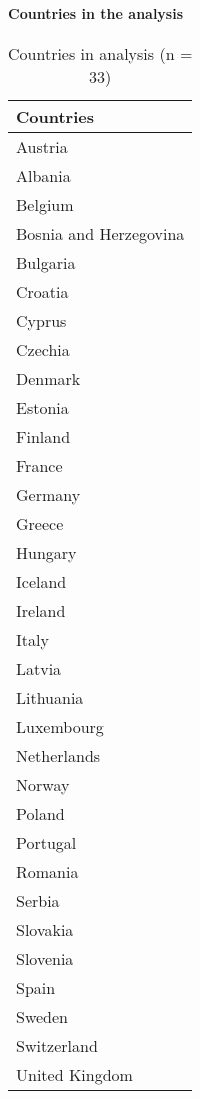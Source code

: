 \documentclass[
]{article}
\begin{document}
\hypertarget{countries-in-the-analysis}{%
\paragraph{Countries in the analysis}\label{countries-in-the-analysis}}

\begin{table}

\caption{\label{tab:unnamed-chunk-16}Countries in analysis (n = 33)}
\centering
\begin{tabular}[t]{l}
\hline
Countries\\
\hline
Austria\\
\hline
Albania\\
\hline
Belgium\\
\hline
Bosnia and Herzegovina\\
\hline
Bulgaria\\
\hline
Croatia\\
\hline
Cyprus\\
\hline
Czechia\\
\hline
Denmark\\
\hline
Estonia\\
\hline
Finland\\
\hline
France\\
\hline
Germany\\
\hline
Greece\\
\hline
Hungary\\
\hline
Iceland\\
\hline
Ireland\\
\hline
Italy\\
\hline
Latvia\\
\hline
Lithuania\\
\hline
Luxembourg\\
\hline
Netherlands\\
\hline
Norway\\
\hline
Poland\\
\hline
Portugal\\
\hline
Romania\\
\hline
Serbia\\
\hline
Slovakia\\
\hline
Slovenia\\
\hline
Spain\\
\hline
Sweden\\
\hline
Switzerland\\
\hline
United Kingdom\\
\hline
\end{tabular}
\end{table}
\end{document}
